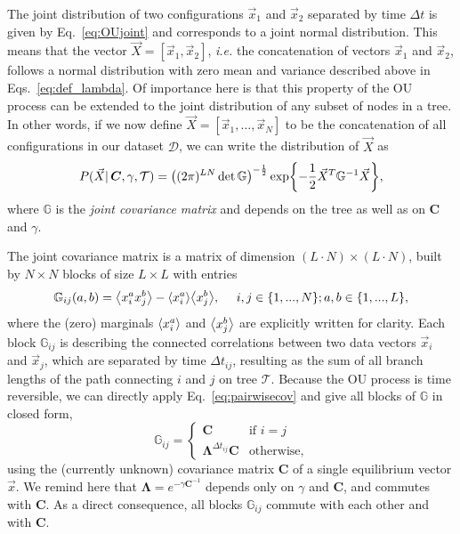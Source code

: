 \documentclass[preprint,amsmath,amssymb,superscriptaddress,showpacs,pre]{revtex4-1}
\let\originalleft\left
\let\originalright\right
\renewcommand{\left}{\mathopen{}\mathclose\bgroup\originalleft}
\renewcommand{\right}{\aftergroup\egroup\originalright}
\def\vx{\vec x}
\newcommand{\Lam}{\bm{\Lambda}}
\newcommand{\curlynormal}[1]{\exp\left\{-\frac{1}{2} #1 \right\}}
\newcommand{\iC}{\bm{C}^{-1}}
\newcommand{\av}[1]{\left\langle #1 \right\rangle}
\begin{document}
The joint distribution of two configurations $\vx_1$ and $\vx_2$ separated by time $\Delta t$ is given by Eq.~\eqref{eq:OUjoint} and corresponds to a joint normal distribution. 
This means that the vector $\vec{X}=[\vx_1, \vx_2]$, \emph{i.e.} the concatenation of vectors $\vx_1$ and $\vx_2$, follows a normal distribution with zero mean and variance described above in Eqs.~\eqref{eq:def_lambda}.
Of importance here is that this property of the OU process can be extended to the joint distribution of any subset of nodes in a tree. 
In other words, if we now define $\vec{X}=[\vx_1,\ldots,\vx_N]$ to be the concatenation of all configurations in our dataset $\mathcal D$, we can write the distribution of $\vec{X}$ as
\begin{equation}
	P(\vec{X}\vert\,\bm{C},\gamma,\mathcal{T}) = \left((2\pi)^{LN}\det\mathbb{G}\right)^{-\frac{1}{2}}\curlynormal{\vec{X}^T\mathbb{G}^{-1}\vec{X}},
	\label{eq:multiOU_jointall}
\end{equation}
where $\mathbb{G}$ is the \emph{joint covariance matrix} and depends on the tree as well as on $\bm{C}$ and $\gamma$.

The joint covariance matrix is a matrix of dimension $(L\cdot N)\times(L\cdot N)$, built by $N\times N$ blocks of size $L\times L$ with entries
\begin{equation}
	\mathbb{G}_{ij}(a,b) = \av{x_i^a x_j^b} - \av{x_i^a}\av{x_j^b},\ \ \ \ i,j\in\{1,...,N\}; a,b\in\{1,...,L\},
	\label{eq:jointcov_1}
\end{equation}
where the (zero) marginals $\av{x_i^a}$ and $\av{x_j^b}$ are explicitly written for clarity.
Each block $\mathbb{G}_{ij}$ is describing the connected correlations between two data vectors $\vx_i$ and $\vx_j$, which are separated by time $\Delta t_{ij}$, resulting as the sum of all branch lengths of the path connecting $i$ and $j$ on tree $\mathcal{T}$. Because the OU process is time reversible, we can directly apply Eq.~\eqref{eq:pairwisecov} and give all blocks of $\mathbb{G}$ in closed form, 
\begin{equation}
	\mathbb{G}_{ij} =
	\begin{cases}
		\bm C & \text{if $i=j$}\\
		\Lam^{\Delta t_{ij}}{\bm C} & \text{otherwise}  ,
	\end{cases}
	\label{eq:jointcov_2}
\end{equation}
using the (currently unknown) covariance matrix $\bm C$ of a single equilibrium vector $\vx$. We remind here that $\Lam = e^{-\gamma\iC}$ depends only on $\gamma$ and $\bm C$, and commutes with $\bm C$. As a direct consequence, all blocks $\mathbb{G}_{ij}$ commute with each other and with $\bm C$.
\end{document}

